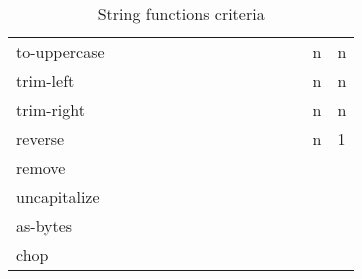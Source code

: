 \documentclass[anonymous,sigplan,review,11pt,nonacm,natbib=false]{acmart}
\begin{document}
\begin{table*}
\begin{tabular}{lllllllllllllll}
            to-uppercase &  &  &  &  &  &  &  &  &  &  &  &  & n & n \\

            trim-left &  &  &  &  &  &  &  &  &  &  &  &  & n & n \\

            trim-right &  &  &  &  &  &  &  &  &  &  &  &  & n & n \\

            reverse &  &  &  &  &  &  &  &  &  &  &  &  & n & 1 \\

            remove &  &  &  &  &  &  &  &  &  &  &  &  &  & \\

            uncapitalize &  &  &  &  &  &  &  &  &  &  &  &  &  & \\

            as-bytes &  &  &  &  &  &  &  &  &  &  &  &  &  & \\

            chop &  &  &  &  &  &  &  &  &  &  &  &  &  & \\ \hline
        \end{tabular}
        \caption{String functions criteria}
        \label{tab:my_label}
    \end{table*}

    \printbibliography
\end{document}
